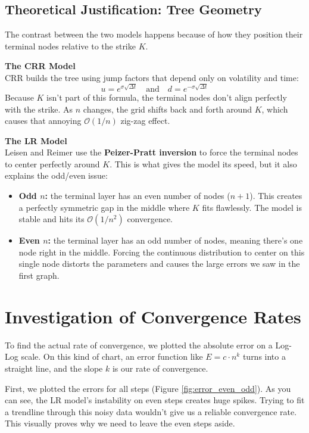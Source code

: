 \documentclass{report}
\begin{document}
\subsection{Theoretical Justification: Tree Geometry}
The contrast between the two models happens because of how they position their terminal nodes relative to the strike $K$.

\textbf{The CRR Model} \\
CRR builds the tree using jump factors that depend only on volatility and time:
$$u = e^{\sigma \sqrt{\Delta t}} \quad \text{and} \quad d = e^{-\sigma \sqrt{\Delta t}}$$
Because $K$ isn't part of this formula, the terminal nodes don't align perfectly with the strike. As $n$ changes, the grid shifts back and forth around $K$, which causes that annoying $\mathcal{O}(1/n)$ zig-zag effect.

\textbf{The LR Model} \\
Leisen and Reimer use the \textbf{Peizer-Pratt inversion} to force the terminal nodes to center perfectly around $K$. This is what gives the model its speed, but it also explains the odd/even issue:
\begin{itemize}
    \item \textbf{Odd $n$:} the terminal layer has an even number of nodes ($n+1$). This creates a perfectly symmetric gap in the middle where $K$ fits flawlessly. The model is stable and hits its $\mathcal{O}(1/n^2)$ convergence.
    \item \textbf{Even $n$:} the terminal layer has an odd number of nodes, meaning there's one node right in the middle. Forcing the continuous distribution to center on this single node distorts the parameters and causes the large errors we saw in the first graph.
\end{itemize}

\section{Investigation of Convergence Rates}
To find the actual rate of convergence, we plotted the absolute error on a Log-Log scale. On this kind of chart, an error function like $E = c \cdot n^k$ turns into a straight line, and the slope $k$ is our rate of convergence.

First, we plotted the errors for all steps (Figure \ref{fig:error_even_odd}). As you can see, the LR model's instability on even steps creates huge spikes. Trying to fit a trendline through this noisy data wouldn't give us a reliable convergence rate. This visually proves why we need to leave the even steps aside.
\end{document}
